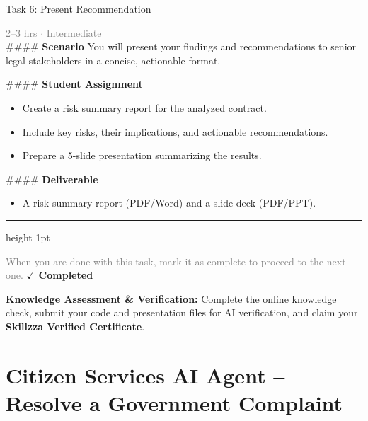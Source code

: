\documentclass[10pt,a4paper]{article}
\begin{document}
\begin{taskbox}{Task 6: Present Recommendation}

    {\small \textcolor{gray}{2--3 hrs $\cdot$ Intermediate}}\\[12pt]

    \#\#\#\# \textbf{Scenario}  
You will present your findings and recommendations to senior legal stakeholders in a concise, actionable format.  

\#\#\#\# \textbf{Student Assignment}  
\begin{itemize}
    \item Create a risk summary report for the analyzed contract.  
    \item Include key risks, their implications, and actionable recommendations.  
    \item Prepare a 5-slide presentation summarizing the results.  
\end{itemize}

\#\#\#\# \textbf{Deliverable}  
\begin{itemize}
    \item A risk summary report (PDF/Word) and a slide deck (PDF/PPT).\par
\end{itemize}

    \vspace{16pt}

    \textcolor{cardBorder}{\hrule height 1pt}\vspace{8pt}

    \small \textcolor{gray}{When you are done with this task, mark it as complete to proceed to the next one.} \hfill \textbf{\textcolor{brandDark}{$\checkmark$ Completed}}

\end{taskbox}

\begin{completionbox}
    \textbf{Knowledge Assessment \& Verification:} Complete the online knowledge check, submit your code and presentation files for AI verification, and claim your \textbf{Skillzza Verified Certificate}.
\end{completionbox}

\newpage




\section*{Citizen Services AI Agent – Resolve a Government Complaint}
\end{document}
